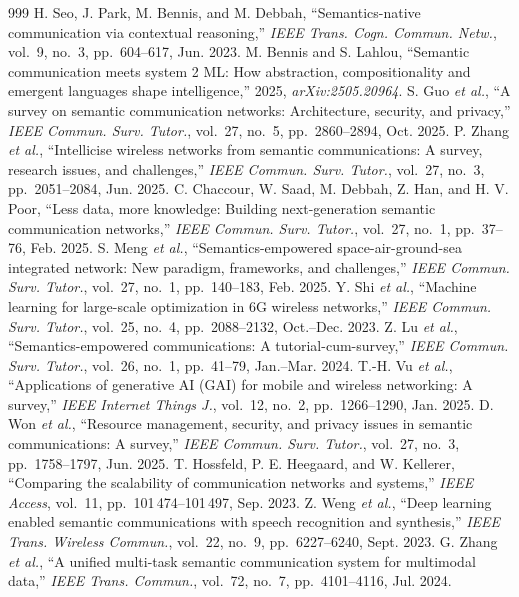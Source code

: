 \begin{thebibliography}{999}
 H. Seo, J. Park, M. Bennis, and M. Debbah, ``Semantics-native communication via contextual reasoning,'' \emph{IEEE Trans. Cogn. Commun. Netw.}, vol.~9, no.~3, pp.~604--617, Jun. 2023.
 M. Bennis and S. Lahlou, ``Semantic communication meets system 2 ML: How abstraction, compositionality and emergent languages shape intelligence,'' 2025, \emph{arXiv:2505.20964}.
 S. Guo \emph{et al.}, ``A survey on semantic communication networks: Architecture, security, and privacy,'' \emph{IEEE Commun. Surv. Tutor.}, vol.~27, no.~5, pp.~2860--2894, Oct. 2025.
 P. Zhang \emph{et al.}, ``Intellicise wireless networks from semantic communications: A survey, research issues, and challenges,'' \emph{IEEE Commun. Surv. Tutor.}, vol.~27, no.~3, pp.~2051--2084, Jun. 2025.
 C. Chaccour, W. Saad, M. Debbah, Z. Han, and H. V. Poor, ``Less data, more knowledge: Building next-generation semantic communication networks,'' \emph{IEEE Commun. Surv. Tutor.}, vol.~27, no.~1, pp.~37--76, Feb. 2025.
 S. Meng \emph{et al.}, ``Semantics-empowered space-air-ground-sea integrated network: New paradigm, frameworks, and challenges,'' \emph{IEEE Commun. Surv. Tutor.}, vol.~27, no.~1, pp.~140--183, Feb. 2025.
 Y. Shi \emph{et al.}, ``Machine learning for large-scale optimization in 6G wireless networks,'' \emph{IEEE Commun. Surv. Tutor.}, vol.~25, no.~4, pp.~2088--2132, Oct.--Dec. 2023.
 Z. Lu \emph{et al.}, ``Semantics-empowered communications: A tutorial-cum-survey,'' \emph{IEEE Commun. Surv. Tutor.}, vol.~26, no.~1, pp.~41--79, Jan.--Mar. 2024.
 T.-H. Vu \emph{et al.}, ``Applications of generative AI (GAI) for mobile and wireless networking: A survey,'' \emph{IEEE Internet Things J.}, vol.~12, no.~2, pp.~1266--1290, Jan. 2025.
 D. Won \emph{et al.}, ``Resource management, security, and privacy issues in semantic communications: A survey,'' \emph{IEEE Commun. Surv. Tutor.}, vol.~27, no.~3, pp.~1758--1797, Jun. 2025.
 T. Hossfeld, P. E. Heegaard, and W. Kellerer, ``Comparing the scalability of communication networks and systems,'' \emph{IEEE Access}, vol.~11, pp.~101\,474--101\,497, Sep. 2023.
 Z. Weng \emph{et al.}, ``Deep learning enabled semantic communications with speech recognition and synthesis,'' \emph{IEEE Trans. Wireless Commun.}, vol.~22, no.~9, pp.~6227--6240, Sept. 2023.
 G. Zhang \emph{et al.}, ``A unified multi-task semantic communication system for multimodal data,'' \emph{IEEE Trans. Commun.}, vol.~72, no.~7, pp.~4101--4116, Jul. 2024.

\end{thebibliography}
